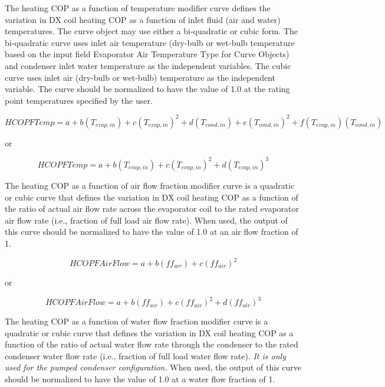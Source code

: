 The heating COP as a function of temperature modifier curve defines the variation in DX coil heating COP as a function of inlet fluid (air and water) temperatures. The curve object may use either a bi-quadratic or cubic form. The bi-quadratic curve uses inlet air temperature (dry-bulb or wet-bulb temperature based on the input field Evaporator Air Temperature Type for Curve Objects) and condenser inlet water temperature as the independent variables. The cubic curve uses inlet air (dry-bulb or wet-bulb) temperature as the independent variable. The curve should be normalized to have the value of 1.0 at the rating point temperatures specified by the user.

\begin{equation}
HCOPFTemp = a + b\left( {{T_{evap,in}}} \right) + c{\left( {{T_{evap,in}}} \right)^2} + d\left( {{T_{cond,in}}} \right) + e{\left( {{T_{cond,in}}} \right)^2} + f\left( {{T_{evap,in}}} \right)\left( {{T_{cond,in}}} \right)
\end{equation}

or

\begin{equation}
HCOPFTemp = a + b\left( {{T_{evap,in}}} \right) + c{\left( {{T_{evap,in}}} \right)^2} + d{\left( {{T_{evap,in}}} \right)^3}
\end{equation}

The heating COP as a function of air flow fraction modifier curve is a quadratic or cubic curve that defines the variation in DX coil heating COP as a function of the ratio of actual air flow rate across the evaporator coil to the rated evaporator air flow rate (i.e., fraction of full load air flow rate). When used, the output of this curve should be normalized to have the value of 1.0 at an air flow fraction of 1.

\begin{equation}
HCOPFAirFlow = a + b\left( {f{f_{air}}} \right) + c{\left( {f{f_{air}}} \right)^2}
\end{equation}

or

\begin{equation}
HCOPFAirFlow = a + b\left( {f{f_{air}}} \right) + c{\left( {f{f_{air}}} \right)^2} + d{\left( {f{f_{air}}} \right)^3}
\end{equation}

The heating COP as a function of water flow fraction modifier curve is a quadratic or cubic curve that defines the variation in DX coil heating COP as a function of the ratio of actual water flow rate through the condenser to the rated condenser water flow rate (i.e., fraction of full load water flow rate). \emph{It is only used for the pumped condenser configuration.} When used, the output of this curve should be normalized to have the value of 1.0 at a water flow fraction of 1.

